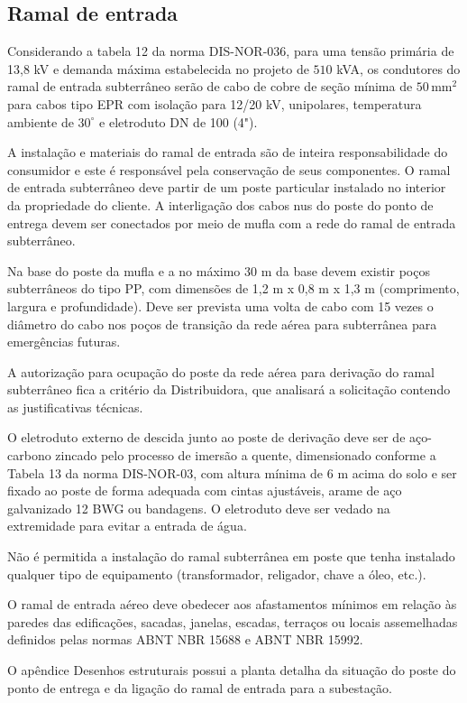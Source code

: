 \subsection{Ramal de entrada}



Considerando a tabela 12 da norma DIS-NOR-036, para uma tensão primária de 13,8 kV e demanda máxima estabelecida no projeto de $510$ kVA, os condutores do ramal de entrada subterrâneo serão de cabo de cobre de seção mínima de $50 \, \text{mm}^2$ para cabos tipo EPR com isolação para 12/20 kV, unipolares, temperatura ambiente de $30^{\circ}$ e eletroduto DN de 100 (4").

A instalação e materiais do ramal de entrada são de inteira responsabilidade do consumidor e este é responsável pela conservação de seus componentes. O ramal de entrada subterrâneo deve partir de um poste particular instalado no interior da propriedade do cliente. A interligação dos cabos nus do poste do ponto de entrega devem ser conectados por meio de mufla com a rede do ramal de entrada subterrâneo.

Na base do poste da mufla e a no máximo 30 m da base devem existir poços subterrâneos do tipo PP, com dimensões de 1,2 m x 0,8 m x 1,3 m (comprimento, largura e profundidade). Deve ser prevista uma volta de cabo com 15 vezes o diâmetro do cabo nos poços de transição da rede aérea para subterrânea para emergências futuras.

A autorização para ocupação do poste da rede aérea para derivação do ramal subterrâneo fica a critério da Distribuidora, que analisará a
solicitação contendo as justificativas técnicas.

O eletroduto externo de descida junto ao poste de derivação deve ser de aço-carbono zincado pelo processo de imersão a quente, dimensionado conforme a Tabela 13 da norma DIS-NOR-03, com altura mínima de 6 m acima do solo e ser fixado ao poste de forma adequada com cintas ajustáveis, arame de aço galvanizado 12 BWG ou bandagens. O eletroduto deve ser vedado na extremidade para evitar a entrada de água.

Não é permitida a instalação do ramal subterrânea em poste que tenha instalado qualquer tipo de equipamento (transformador, religador, chave a óleo, etc.).


O ramal de entrada aéreo deve obedecer aos afastamentos mínimos em relação às paredes das edificações, sacadas, janelas, escadas, terraços ou locais assemelhadas definidos pelas normas ABNT NBR 15688 e ABNT NBR 15992.

O apêndice Desenhos estruturais possui a planta detalha da situação do poste do ponto de entrega e da ligação do ramal de entrada para a subestação.


